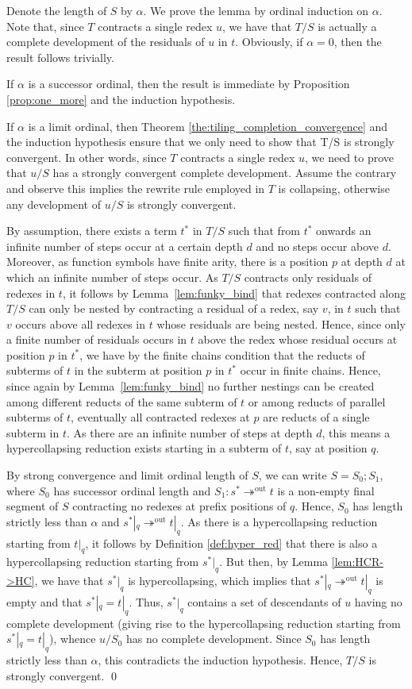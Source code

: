 \documentclass{LMCS}
\theoremstyle{plain}
\theoremstyle{definition}
\newcommand{\trewt}{\twoheadrightarrow}
\newcommand{\out}{\trewt^\mathrm{out}}
\begin{document}
\proof
Denote the length of $S$ by $\alpha$. We prove the lemma by ordinal induction on $\alpha$. Note that, since $T$ contracts a single redex $u$, we have that $T/S$ is actually a complete development of the residuals of $u$ in $t$. Obviously, if $\alpha = 0$, then the result follows trivially.

If $\alpha$ is a successor ordinal, then the result is immediate by Proposition \ref{prop:one_more} and the induction hypothesis.

If $\alpha$ is a limit ordinal, then Theorem \ref{the:tiling_completion_convergence} and the induction hypothesis ensure that we only need to show that T/S is strongly convergent. In other words, since $T$ contracts a single redex $u$, we need to prove that $u/S$ has a strongly convergent complete development. Assume the contrary and observe this implies the rewrite rule employed in $T$ is collapsing, otherwise any development of $u/S$ is strongly convergent.

By assumption, there exists a term $t^*$ in $T/S$ such that from $t^*$ onwards an infinite number of steps occur at a certain depth $d$ and no steps occur above $d$. Moreover, as function symbols have finite arity, there is a position $p$ at depth $d$ at which an infinite number of steps occur. As $T/S$ contracts only residuals of redexes in $t$, it follows by Lemma~\ref{lem:funky_bind} that redexes contracted along $T/S$ can only be nested by contracting a residual of a redex, say $v$, in $t$ such that $v$ occurs above all redexes in $t$ whose residuals are being nested. Hence, since only a finite number of residuals occurs in $t$ above the redex whose residual occurs at position $p$ in $t^*$, we have by the finite chains condition that the reducts of subterms of $t$ in the subterm at position $p$ in $t^*$ occur in finite chains. Hence, since again by Lemma~\ref{lem:funky_bind} no further nestings can be created among different reducts of the same subterm of $t$ or among reducts of parallel subterms of $t$, eventually all contracted redexes at $p$ are reducts of a single subterm in $t$. As there are an infinite number of steps at depth $d$, this means a hypercollapsing reduction exists starting in a subterm of $t$, say at position $q$.

By strong convergence and limit ordinal length of $S$, we can write $S = S_0 ; S_1$, where $S_0$ has successor ordinal length and $S_1 : s^* \out t$ is a non-empty final segment of $S$ contracting no redexes at prefix positions of $q$. Hence, $S_0$ has length strictly less than $\alpha$ and $s^*|_q \out t|_q$. As there is a hypercollapsing reduction starting from $t|_q$, it follows by Definition \ref{def:hyper_red} that there is also a hypercollapsing reduction starting from $s^*|_q$. But then, by Lemma \ref{lem:HCR->HC}, we have that $s^*|_q$ is hypercollapsing, which implies that $s^*|_q \out t|_q$ is empty and that $s^*|_q = t|_q$. Thus, $s^*|_q$ contains a set of descendants of $u$ having no complete development (giving rise to the hypercollapsing reduction starting from $s^*|_q = t|_q$), whence $u/S_0$ has no complete development. Since $S_0$ has length strictly less than $\alpha$, this contradicts the induction hypothesis. Hence, $T/S$ is strongly convergent. \qed
\end{document}
